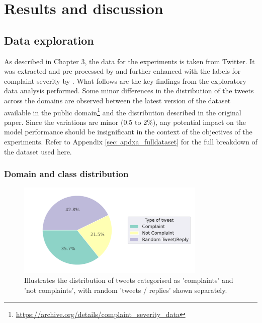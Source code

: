 \chapter{Results and discussion}

\section{Data exploration}
As described in Chapter 3, the data for the experiments is taken from Twitter. It was extracted and pre-processed by \cite{preotiuc-pietro_automatically_2019} and further enhanced with the labels for complaint severity by \cite{jinModelingSeverityComplaints2021}. What follows are the key findings from the exploratory data analysis performed. Some minor differences in the distribution of the tweets across the domains are observed between the latest version of the dataset available in the public domain\footnote{\url{https://archive.org/details/complaint_severity_data}} and the distribution described in the original paper. Since the variations are minor (0.5 to 2\%), any potential impact on the model performance should be insignificant in the context of the objectives of the experiments. Refer to Appendix \ref{sec: apdxa_fulldataset} for the full breakdown of the dataset used here.

\subsection{Domain and class distribution}
\begin{figure}[htb]
    \centering
    \captionsetup{font=small}
    \includegraphics[width=9cm]{figures/compl_non_random_dist.pdf}
    \vspace*{-3mm}
    \caption{Illustrates the distribution of tweets categorised as 'complaints' and 'not complaints', with random 'tweets / replies' shown separately.}
    \label{fig: compl_non_random_dist}
\end{figure}


